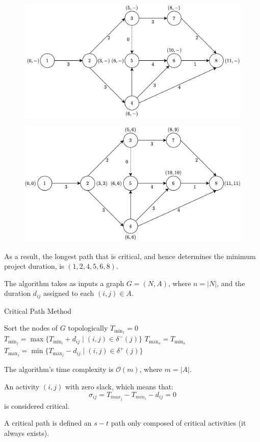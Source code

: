 \begin{example}
    \begin{figure}[H]
        \centering
        \includegraphics[width=0.6\linewidth]{images/aproject.png}
    \end{figure}
    \begin{figure}[H]
        \centering
        \includegraphics[width=0.6\linewidth]{images/aproject1.png}
    \end{figure}
    As a result, the longest path that is critical, and hence determines the minimum project duration, is $(1,2,4,5,6,8)$.
\end{example}

The algorithm takes as inputs a graph $G = (N,A)$, where $n= \left\lvert N \right\rvert $, and the duration $d_{ij}$ assigned to each $(i,j) \in A$. 
\begin{algorithm}[H]
    \caption{Critical Path Method}
        \begin{algorithmic}[1]
            \State Sort the nodes of $G$ topologically
            \State $T_{{\min}_1} = 0$
                \State $T_{{\min}_j} = \max\{T_{{\min}_i}+d_{ij}\mid (i,j) \in \delta^{-}(j)\}$
            \EndFor
            \State $T_{{\max}_n} = T_{{\min}_n}$
                \State $T_{{\max}_j} = \min\{T_{{\max}_j}-d_{ij}\mid (i,j) \in \delta^{+}(j)\}$
            \EndFor
        \end{algorithmic}
\end{algorithm}
The algorithm's time complexity is $\mathcal{O}(m)$, where $m =\left\lvert A\right\rvert$. 
\begin{definition}
    An activity $(i,j)$ with zero slack, which means that:
    \[\sigma_{ij}=T_{max_j}-T_{min_i}-d_{ij}=0\]
    is considered critical. 
\end{definition}
\begin{definition}
    A critical path is defined an $s-t$ path only composed of critical activities (it always exists).
\end{definition}

